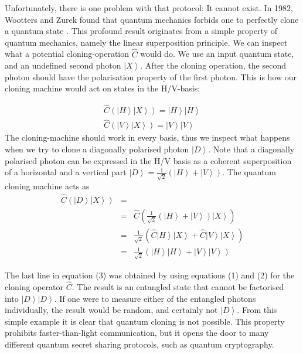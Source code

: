 \documentclass{article}
\begin{document}
Unfortunately, there is one problem with that protocol: It cannot exist. In 1982, Wootters and Zurek found that quantum mechanics forbids one to perfectly clone a quantum state \cite{Wootters:1982ex}. This profound result originates from a simple property of quantum mechanics, namely the linear superposition principle. We can inspect what a potential cloning-operation $\hat{C}$ would do. We use an input quantum state, and an undefined second photon $\left|X\right\rangle$. After the cloning operation, the second photon should have the polarisation property of the first photon. This is how our cloning machine would act on states in the H/V-basis:

\begin{eqnarray}
\hat{C}(\left|H\right\rangle\left|X\right\rangle)=\left|H\right\rangle\left|H\right\rangle \\
\hat{C}(\left|V\right\rangle\left|X\right\rangle)=\left|V\right\rangle\left|V\right\rangle
\end{eqnarray} 
The cloning-machine should work in every basis, thus we inspect what happens when we try to clone a diagonally polarised photon $\left|D\right\rangle$. Note that a diagonally polarised photon can be expressed in the H/V basis as a coherent superposition of a horizontal and a vertical part $\left|D\right\rangle=\frac{1}{\sqrt{2}}(\left|H\right\rangle + \left|V\right\rangle)$. The quantum cloning machine acts as 
\begin{eqnarray}
\hat{C}(\left|D\right\rangle\left|X\right\rangle)&=&\\\nonumber
&=&\hat{C}(\frac{1}{\sqrt{2}}(\left|H\right\rangle + \left|V\right\rangle)\left|X\right\rangle)\\\nonumber
&=&\frac{1}{\sqrt{2}}(\hat{C}\left|H\right\rangle\left|X\right\rangle + \hat{C}\left|V\right\rangle\left|X\right\rangle)\\\nonumber
&=&\frac{1}{\sqrt{2}}(\left|H\right\rangle\left|H\right\rangle + \left|V\right\rangle\left|V\right\rangle)
\end{eqnarray} 

The last line in equation (3) was obtained by using equations (1) and (2) for the cloning operator $\hat{C}$. The result is an entangled state that cannot be factorised into $\left|D\right\rangle\left|D\right\rangle$. If one were to measure either of the entangled photons individually, the result would be random, and certainly not $\left|D\right\rangle$. From this simple example it is clear that quantum cloning is not possible. This property prohibits faster-than-light communication, but it opens the door to many different quantum secret sharing protocols, such as quantum cryptography.
\end{document}
